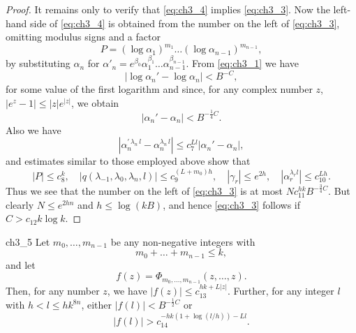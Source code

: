 \begin{proof}
It remains only to verify that \eqref{eq:ch3_4} implies \eqref{eq:ch3_3}. Now the left-hand side of \eqref{eq:ch3_4} is obtained from the number on the left of \eqref{eq:ch3_3}, omitting modulus signs and a factor
\[
P = (\log \alpha_1)^{m_1} \dots (\log \alpha_{n-1})^{m_{n-1}},
\]
by substituting $\alpha_n$ for $\alpha'_n = e^{\beta_0} \alpha_1^{\beta_1} \dots \alpha_{n-1}^{\beta_{n-1}}$. From \eqref{eq:ch3_1} we have
\[
|\log \alpha_n' - \log \alpha_n| < B^{-C},
\]
for some value of the first logarithm and since, for any complex number $z$, $|e^z-1| \le |z| e^{|z|}$, we obtain
\begin{equation} \label{eq:ch3_5}\tag{5}
|\alpha_n' - \alpha_n| < B^{-\frac{1}{4}C}.
\end{equation}
Also we have
\[
\left|\alpha_n^{\prime\,\lambda_n\,l} - \alpha_n^{\lambda_n\,l}\right| \le c_7^{Ll} |\alpha_n' - \alpha_n|,
\]
and estimates similar to those employed above show that
\[
|P| \le c_8^k, \quad |q(\lambda_{-1}, \lambda_0, \lambda_n, l)| \le c_9^{(L+m_0)h}, \quad |\gamma_r| \le e^{2h}, \quad |\alpha_r^{\lambda_r l}| \le c_{10}^{Lh}.
\]
Thus we see that the number on the left of \eqref{eq:ch3_3} is at most $N c_{11}^{hk} B^{-\frac{3}{4}C}$. But clearly $N \le e^{2hn}$ and $h \le \log(kB)$, and hence \eqref{eq:ch3_3} follows if $C > c_{12}k \log k$.
\end{proof}

\begin{mylemma}{}{ch3_5}
Let $m_0, \dots, m_{n-1}$ be any non-negative integers with
\[
m_0 + \dots + m_{n-1} \le k,
\]
and let
\[
f(z) = \Phi_{m_0, \dots, m_{n-1}}(z, \dots, z).
\]
Then, for any number $z$, we have $|f(z)| \le c_{13}^{hk+L|z|}$. Further, for any integer $l$ with $h < l \le hk^{8n}$, either $|f(l)| < B^{-\frac{1}{2}C}$ or
\begin{equation} \label{eq:ch3_6}\tag{6}
|f(l)| > c_{14}^{-hk(1+\log(l/h))-Ll}.
\end{equation}
\end{mylemma}

